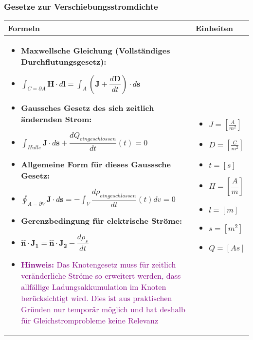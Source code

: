 \subsubsection{Gesetze zur Verschiebungsstromdichte}
\begin{tabular}{ | m{15cm} | m{3cm}  | }
	\hline
	Formeln & Einheiten \\ \hline
	\hline
	\begin{itemize}
    \item  \textbf{Maxwellsche Gleichung (Vollständiges Durchflutungsgesetz):}
	\item[]  $\displaystyle\int_{C=\partial A} \mathbf{H}\cdot d \mathbf{l}=\displaystyle\int_{A}(\mathbf{J}+\dfrac{d\mathbf{D}}{dt})\cdot d\mathbf{s}$
	\itemsep12pt
	\item \textbf{Gaussches Gesetz des sich zeitlich ändernden Strom:}
	\item[] $\displaystyle\int_{H\ddot{u}lle}\mathbf{J}\cdot d\mathbf{s}+\dfrac{dQ_{eingeschlossen}}{dt}(t)=0$
	\item \textbf{Allgemeine Form für dieses Gausssche Gesetz:}
	\item[] $\displaystyle\oint_{A=\partial V}\mathbf{J}\cdot d\mathbf{s}=-\displaystyle\int_{V}\dfrac{d\rho_{eingeschlossen}}{dt}(t)dv=0$
	\item \textbf{Gerenzbedingung für elektrische Ströme:}
	\item[] $\mathbf{\hat{n}\cdot J_1=\hat{n}\cdot J_2}-\dfrac{d\rho_s}{dt}$
	\item \textcolor{purple}{\textbf{Hinweis:} Das Knotengesetz muss für zeitlich veränderliche Ströme so erweitert werden, dass allfällige Ladungsakkumulation im Knoten berücksichtigt wird. Dies ist aus praktischen Gründen nur temporär möglich und hat deshalb für Gleichstromprobleme keine Relevanz}	
\end{itemize}
	&   	
	\begin{itemize}
		\item[] $J=[\frac{A}{m^2}]$
		\item[] $D=[\frac{C}{m^2}]$
		\item[]	$t=[s]$
		\item[]	$H=[\dfrac{A}{m}]$
		\item[]	$l=[m]$
		\item[]	$s=[m^2]$
		\item[] $Q=[As]$
	\end{itemize} 
	\\ \hline
\end{tabular}




   									
